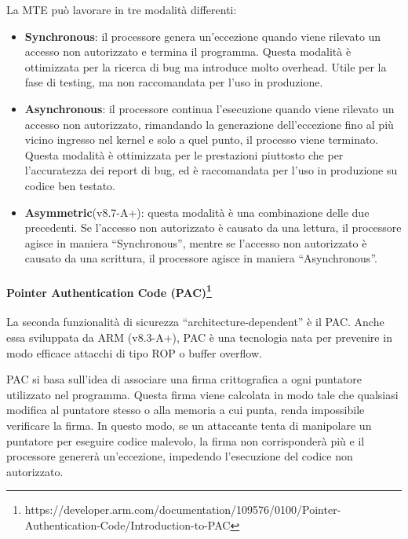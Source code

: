 La MTE può lavorare in tre modalità differenti:
\begin{itemize}
  \item \textbf{Synchronous}: il processore genera un'eccezione quando viene rilevato
    un accesso non autorizzato e termina il programma. Questa modalità è
    ottimizzata per la ricerca di bug ma introduce molto overhead. Utile per la fase
    di testing, ma non raccomandata per l'uso in produzione.

  \item \textbf{Asynchronous}: il processore continua l'esecuzione quando viene rilevato
    un accesso non autorizzato, rimandando la generazione dell'eccezione fino al
    più vicino ingresso nel kernel e solo a quel punto, il processo viene terminato.
    Questa modalità è ottimizzata per le prestazioni piuttosto che per l'accuratezza
    dei report di bug, ed è raccomandata per l'uso in produzione su codice ben testato.

  \item \textbf{Asymmetric}(v8.7-A+): questa modalità è una combinazione delle
    due precedenti. Se l'accesso non autorizzato è causato da una lettura, il
    processore agisce in maniera ``Synchronous'', mentre se l'accesso non autorizzato
    è causato da una scrittura, il processore agisce in maniera ``Asynchronous''.
\end{itemize}

\paragraph{Pointer Authentication Code (PAC)\protect\footnote{https://developer.arm.com/documentation/109576/0100/Pointer-Authentication-Code/Introduction-to-PAC}}
La seconda funzionalità di sicurezza ``architecture-dependent'' è il PAC. Anche
essa sviluppata da ARM (v8.3-A+), PAC è una tecnologia nata per prevenire in modo
efficace attacchi di tipo ROP o buffer overflow.

PAC si basa sull'idea di associare una firma crittografica a ogni puntatore utilizzato
nel programma. Questa firma viene calcolata in modo tale che qualsiasi modifica
al puntatore stesso o alla memoria a cui punta, renda impossibile verificare la firma.
In questo modo, se un attaccante tenta di manipolare un puntatore per eseguire codice
malevolo, la firma non corrisponderà più e il processore genererà un'eccezione, impedendo
l'esecuzione del codice non autorizzato.

